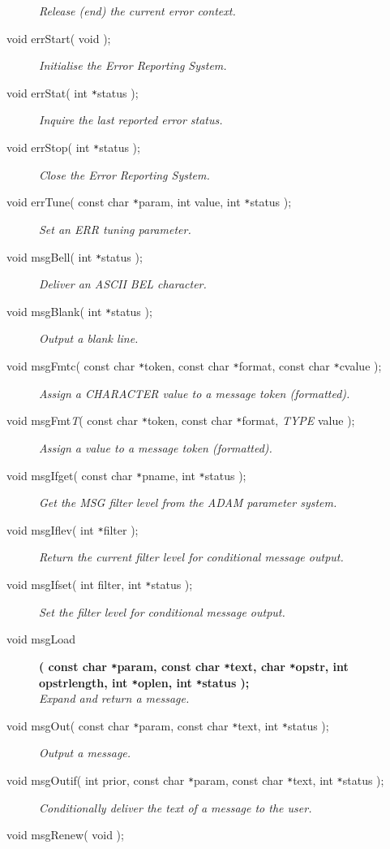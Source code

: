 \documentclass[twoside,11pt]{article}
\renewcommand{\_}{\texttt{\symbol{95}}}
\newcommand{\listline}{\hspace{1pt}\\}
\renewcommand{\listline}{}
\begin{document}
\begin{description}
\textit{Release (end) the current error context.}
\item[void errStart( void );] \listline
\textit{Initialise the Error Reporting System.}
\item[void errStat( int \texttt{*}status );] \listline
\textit{Inquire the last reported error status.}
\item[void errStop( int \texttt{*}status );] \listline
\textit{Close the Error Reporting System.}
\item[void errTune( const char \texttt{*}param, int value, 
int \texttt{*}status );] \listline
\textit{Set an ERR tuning parameter.}
\item[void msgBell( int \texttt{*}status );] \listline
\textit{Deliver an ASCII BEL character.}
\item[void msgBlank( int \texttt{*}status );] \listline
\textit{Output a blank line.}
\item[void msgFmtc( const char \texttt{*}token, const char \texttt{*}format, 
const char \texttt{*}cvalue );] \listline
\textit{Assign a CHARACTER value to a message token (formatted).}
\item[void msgFmt\textit{T}( const char \texttt{*}token,
const char \texttt{*}format, \textit{TYPE} value );] \listline
\textit{Assign a value to a message token (formatted).}
\item[void msgIfget( const char \texttt{*}pname, int \texttt{*}status );] \listline
\textit{Get the MSG filter level from the ADAM parameter system.}
\item[void msgIflev( int \texttt{*}filter );] \listline
\textit{Return the current filter level for conditional message output.}
\item[void msgIfset( int filter, int \texttt{*}status );] \listline
\textit{Set the filter level for conditional message output.}
\item[void msgLoad] \listline
\textbf{( const char \texttt{*}param, const char \texttt{*}text, {\listline}
char \texttt{*}opstr, int opstr\_length, int \texttt{*}oplen,
int \texttt{*}status );}\\
\textit{Expand and return a message.}
\item[void msgOut( const char \texttt{*}param, const char \texttt{*}text, 
int \texttt{*}status );] \listline
\textit{Output a message.}
\item[void msgOutif( int prior, const char \texttt{*}param, 
const char \texttt{*}text, int \texttt{*}status );] \listline
\textit{Conditionally deliver the text of a message to the user.}
\item[void msgRenew( void );] \listline

\end{description}
\end{document}
